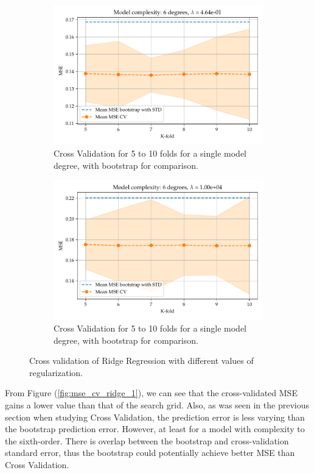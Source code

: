 \documentclass[11pt, a4paper]{article}
\begin{document}
\begin{figure}
\begin{subfigure}{0.49\textwidth}
    \includegraphics[width=\textwidth]{figures/EX4_mse_cv_boot26.pdf}
    \caption{\label{fig:mse_cv_ridge_3}Cross Validation for 5 to 10 folds for a single model degree, with bootstrap for comparison.}
  \end{subfigure}
  \hfill
  \begin{subfigure}{0.49\textwidth}
      \centering
      \includegraphics[width=\textwidth]{figures/EX4_mse_cv_boot36.pdf}
      \caption{\label{fig:mse_cv_ridge_4}Cross Validation for 5 to 10 folds for a single model degree, with bootstrap for comparison.}
  \end{subfigure}
  \caption{\label{sfig:ridge_cv_1}Cross validation of Ridge Regression with different values of regularization.}
\end{figure}


From Figure (\ref{fig:mse_cv_ridge_1}), we can see that the cross-validated MSE gains a lower value than that of the search grid. Also, as was seen in the previous section when studying Cross Validation, the prediction error is less varying than the bootstrap prediction error. However, at least for a model with complexity to the sixth-order. There is overlap between the bootstrap and cross-validation standard error, thus the bootstrap could potentially achieve better MSE than Cross Validation.
\end{document}
